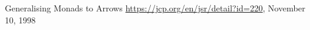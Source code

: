 \begin{thebibliography}{100}
	
	 Generalising Monads to Arrows
	\url{https://jcp.org/en/jsr/detail?id=220}, November 10, 1998
\end{thebibliography}